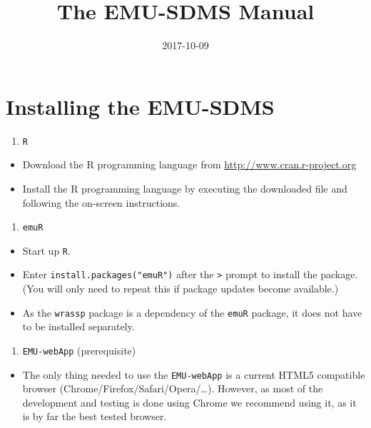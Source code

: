 \documentclass[]{book}
\title{The EMU-SDMS Manual}
\author{}
\date{2017-10-09}
\providecommand{\tightlist}{%
  \setlength{\itemsep}{0pt}\setlength{\parskip}{0pt}}
\theoremstyle{definition}
\theoremstyle{definition}
\theoremstyle{definition}
\theoremstyle{remark}
\begin{document}
\maketitle

{
\setcounter{tocdepth}{1}
\tableofcontents
}
\chapter{Installing the EMU-SDMS}\label{installing-the-emu-sdms}

\begin{enumerate}
\def\labelenumi{\arabic{enumi}.}
\tightlist
\item
  \texttt{R}
\end{enumerate}

\begin{itemize}
\tightlist
\item
  Download the R programming language from
  \href{www.cran.r-project.org}{http://www.cran.r-project.org}
\item
  Install the R programming language by executing the downloaded file
  and following the on-screen instructions.
\end{itemize}

\begin{enumerate}
\def\labelenumi{\arabic{enumi}.}
\setcounter{enumi}{1}
\tightlist
\item
  \texttt{emuR}
\end{enumerate}

\begin{itemize}
\tightlist
\item
  Start up \texttt{R}.
\item
  Enter \texttt{install.packages("emuR")} after the
  \texttt{\textgreater{}} prompt to install the package. (You will only
  need to repeat this if package updates become available.)
\item
  As the \texttt{wrassp} package is a dependency of the \texttt{emuR}
  package, it does not have to be installed separately.
\end{itemize}

\begin{enumerate}
\def\labelenumi{\arabic{enumi}.}
\setcounter{enumi}{2}
\tightlist
\item
  \texttt{EMU-webApp} (prerequisite)
\end{enumerate}

\begin{itemize}
\tightlist
\item
  The only thing needed to use the \texttt{EMU-webApp} is a current
  HTML5 compatible browser (Chrome/Firefox/Safari/Opera/\ldots{}).
  However, as most of the development and testing is done using Chrome
  we recommend using it, as it is by far the best tested browser.
\end{itemize}
\end{document}

